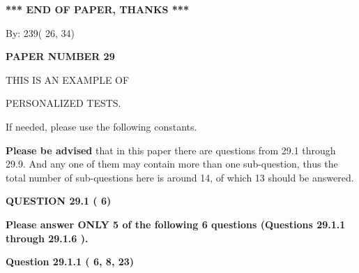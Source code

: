\documentclass[12pt]{article}
\begin{document}
   
   
   
   
\vspace{1.0in} 
{\textbf{\large{ *** END OF PAPER, THANKS *** }}} 
   
   
\hspace{1.0in} By: 
         239(         26,          34)
   
   
   
   
\newpage 
\setcounter{page}{ 
    29001 } 
   
   
   
   
 {\textbf{ \Large{ PAPER NUMBER          29 }}}
   
   
\vspace{0.2in}
   
   
   
   
   
   
 \vspace{0.2in}
 
 
{\Huge  THIS IS AN EXAMPLE OF}
 
{\Huge  PERSONALIZED TESTS. }
 
If needed, please use the following constants.
 
 
 
{\textbf{\large{Please be advised}}} that in this paper there are questions from
29.1 through
29.9.
And any one of them may contain more than one sub-question, thus the total number
of sub-questions here is around 14, of which
13 should be answered.
 
\vspace{0.3in}
 
 
   
   
  
\vspace{0.2in}
  
{\textbf{\Large{QUESTION
29.1 
 (          6)
}}}
  
  
{\textbf{\Large{Please answer ONLY  %
           5 %
 of the following  %
           6 %
 questions (Questions  %
29.1.1 %
 through  %
29.1.6 %
 ). }}}
   
   
  
\vspace{0.2in}
  
{\textbf{\Large{Question
29.1.1 
 (          6,          8,         23)
}}}
  
  
 
 
\end{document}
